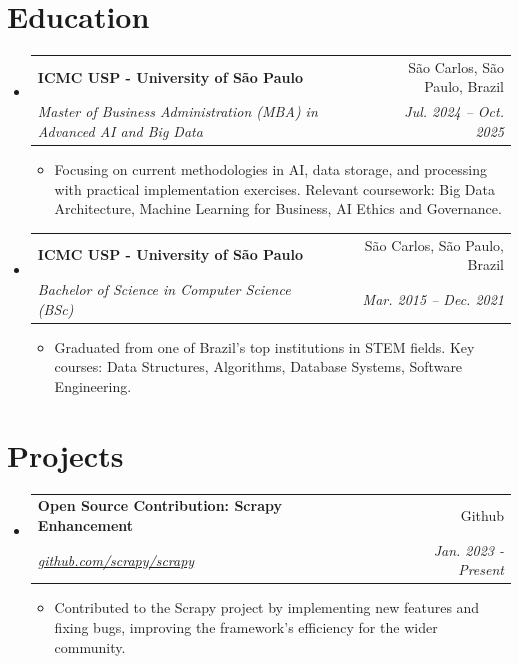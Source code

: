 \documentclass[letterpaper,11pt]{article}
\makeatletter
\newcommand{\resumeItemNoTitle}[1]{
    \item\small{
        {#1 \vspace{-2pt}}
    }
}
\newcommand{\resumeSubheading}[4]{
  \vspace{-1pt}\item
    \begin{tabular*}{0.97\textwidth}[t]{l@{\extracolsep{\fill}}r}
      \textbf{#1} & #2 \\
      \textit{\small#3} & \textit{\small #4} \\
    \end{tabular*}\vspace{-5pt}
}
\newcommand{\resumeSubHeadingListStart}{\begin{itemize}[leftmargin=*]}
\newcommand{\resumeSubHeadingListEnd}{\end{itemize}}
\newcommand{\resumeItemListStart}{\begin{itemize}[leftmargin=*]\setlength\itemsep{1mm}}
\newcommand{\resumeItemListEnd}{\end{itemize}\vspace{-5pt}}
\makeatother
\begin{document}
\section{Education}
  \resumeSubHeadingListStart
    \resumeSubheading
      {ICMC USP - University of São Paulo}{São Carlos, São Paulo, Brazil}
      {Master of Business Administration (MBA) in Advanced AI and Big Data}{Jul. 2024 -- Oct. 2025}
      \resumeItemListStart
        \resumeItemNoTitle
          {Focusing on current methodologies in AI, data storage, and processing with practical implementation exercises. Relevant coursework: Big Data Architecture, Machine Learning for Business, AI Ethics and Governance.}
      \resumeItemListEnd

    \resumeSubheading
      {ICMC USP - University of São Paulo}{São Carlos, São Paulo, Brazil}
      {Bachelor of Science in Computer Science (BSc)}{Mar. 2015 -- Dec. 2021}
      \resumeItemListStart
        \resumeItemNoTitle
          {Graduated from one of Brazil's top institutions in STEM fields. Key courses: Data Structures, Algorithms, Database Systems, Software Engineering.}
      \resumeItemListEnd
  \resumeSubHeadingListEnd
 
\section{Projects}
  \resumeSubHeadingListStart
    \resumeSubheading
      {Open Source Contribution: Scrapy Enhancement}{Github}
      {\href{https://github.com/scrapy/scrapy}{github.com/scrapy/scrapy}}{Jan. 2023 - Present}
    \resumeItemListStart
      \resumeItemNoTitle
        {Contributed to the Scrapy project by implementing new features and fixing bugs, improving the framework's efficiency for the wider community.}
    \resumeItemListEnd
  \resumeSubHeadingListEnd

\end{document}
